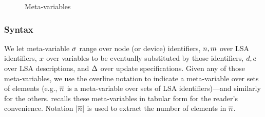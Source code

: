 \documentclass[12pt,a4paper,twoside,openright]{book}
\begin{document}
\begin{figure}[!t]{
 } \caption[Meta-variables for a SAPERE algebra]{Meta-variables} \label{fig:meta}
\end{figure}


\subsubsection{Syntax}

We let meta-variable $\sigma$ range over node (or device) identifiers, $n,m$ over LSA identifiers, $x$ over variables to be eventually substituted by those identifiers, $d,e$ over LSA descriptions, and $\Delta$ over update specifications. Given any of those meta-variables, we use the overline notation to indicate a meta-variable over sets of elements (e.g., $\overline{n}$ is a meta-variable over sets of LSA identifiers)---and similarly for the others.   recalls these meta-variables in tabular form for the reader's convenience. Notation $|\overline{n}|$ is used to extract the number of elements in $\overline{n}$.
\end{document}
